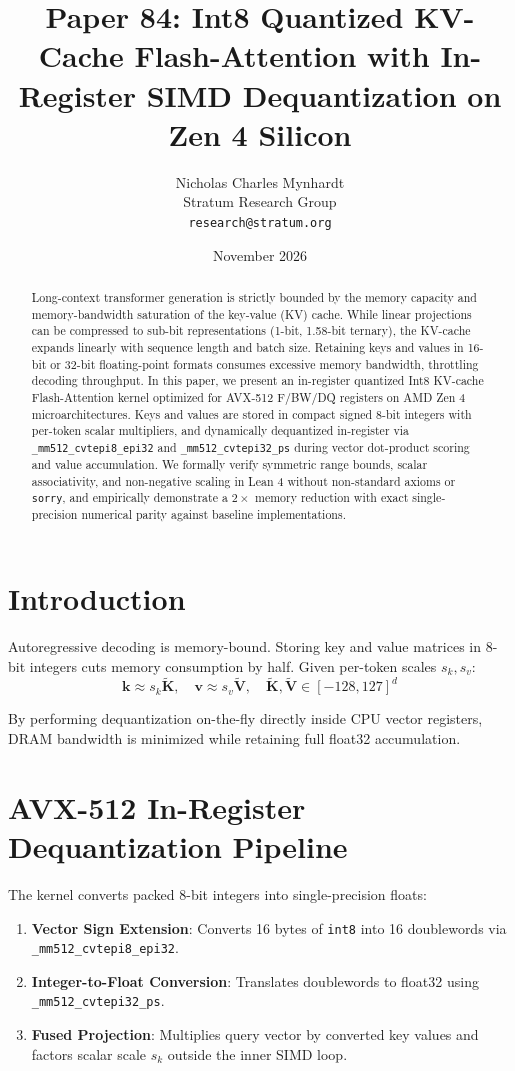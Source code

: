 \documentclass[10pt,twocolumn,letterpaper]{article}
\title{Paper 84: Int8 Quantized KV-Cache Flash-Attention with In-Register SIMD Dequantization on Zen 4 Silicon}
\author{Nicholas Charles Mynhardt \\ Stratum Research Group \\ \texttt{research@stratum.org}}
\date{November 2026}
\begin{document}
\maketitle

\begin{abstract}
Long-context transformer generation is strictly bounded by the memory capacity and memory-bandwidth saturation of the key-value (KV) cache. While linear projections can be compressed to sub-bit representations (1-bit, 1.58-bit ternary), the KV-cache expands linearly with sequence length and batch size. Retaining keys and values in 16-bit or 32-bit floating-point formats consumes excessive memory bandwidth, throttling decoding throughput. In this paper, we present an in-register quantized Int8 KV-cache Flash-Attention kernel optimized for AVX-512 F/BW/DQ registers on AMD Zen 4 microarchitectures. Keys and values are stored in compact signed 8-bit integers with per-token scalar multipliers, and dynamically dequantized in-register via \texttt{\_mm512\_cvtepi8\_epi32} and \texttt{\_mm512\_cvtepi32\_ps} during vector dot-product scoring and value accumulation. We formally verify symmetric range bounds, scalar associativity, and non-negative scaling in Lean 4 without non-standard axioms or \texttt{sorry}, and empirically demonstrate a $2\times$ memory reduction with exact single-precision numerical parity against baseline implementations.
\end{abstract}

\section{Introduction}
Autoregressive decoding is memory-bound. Storing key and value matrices in 8-bit integers cuts memory consumption by half. Given per-token scales $s_k, s_v$:
\begin{equation}
\mathbf{k} \approx s_k \tilde{\mathbf{K}}, \quad \mathbf{v} \approx s_v \tilde{\mathbf{V}}, \quad \tilde{\mathbf{K}}, \tilde{\mathbf{V}} \in [-128, 127]^d
\end{equation}

By performing dequantization on-the-fly directly inside CPU vector registers, DRAM bandwidth is minimized while retaining full float32 accumulation.

\section{AVX-512 In-Register Dequantization Pipeline}
The kernel converts packed 8-bit integers into single-precision floats:
\begin{enumerate}
    \item \textbf{Vector Sign Extension}: Converts 16 bytes of \texttt{int8} into 16 doublewords via \texttt{\_mm512\_cvtepi8\_epi32}.
    \item \textbf{Integer-to-Float Conversion}: Translates doublewords to float32 using \texttt{\_mm512\_cvtepi32\_ps}.
    \item \textbf{Fused Projection}: Multiplies query vector by converted key values and factors scalar scale $s_k$ outside the inner SIMD loop.
\end{enumerate}
\end{document}
